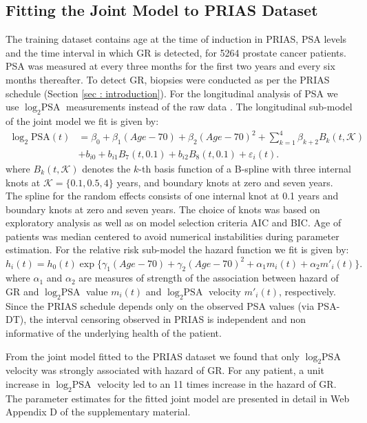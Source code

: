 \subsection{Fitting the Joint Model to PRIAS Dataset}
\label{subsec : jm_fit_prias}
The training dataset contains age at the time of induction in PRIAS, PSA levels and the time interval in which GR is detected, for 5264 prostate cancer patients. PSA was measured at every three months for the first two years and every six months thereafter. To detect GR, biopsies were conducted as per the PRIAS schedule (Section \ref{sec : introduction}). For the longitudinal analysis of PSA we use $\log_2 \mbox{PSA}$ measurements instead of the raw data \citep{nieboer2015nonlinear}. The longitudinal sub-model of the joint model we fit is given by:
\begin{equation}
\label{eq : long_model_prias}
\begin{aligned}
\log_2 \mbox{PSA}(t) &= \beta_0 + \beta_1 (Age-70) + \beta_2 (Age-70)^2 + \sum_{k=1}^4 \beta_{k+2} B_k(t,\mathcal{K})\\ 
&+  b_{i0} + b_{i1} B_7(t, 0.1) + b_{i2} B_8(t, 0.1) +
\varepsilon_i(t).
\end{aligned}
\end{equation}
where $B_k(t, \mathcal{K})$ denotes the $k$-th basis function of a B-spline with three internal knots at $\mathcal{K} =\{0.1, 0.5, 4\}$ years, and boundary knots at zero and seven years. The spline for the random effects consists of one internal knot at 0.1 years and boundary knots at zero and seven years. The choice of knots was based on exploratory analysis as well as on model selection criteria AIC and BIC. Age of patients was median centered to avoid numerical instabilities during parameter estimation. For the relative risk sub-model the hazard function we fit is given by:
\begin{equation}
\label{eq : hazard_prias}
h_i(t) = h_0(t) \exp\big\{\gamma_1 (Age-70)  + \gamma_2 (Age-70)^2 + \alpha_1 m_i(t) + \alpha_2 m'_i(t)\big\}.
\end{equation}
where $\alpha_1$ and $\alpha_2$ are measures of strength of the association between hazard of GR and $\log_2 \mbox{PSA}$ value $m_i(t)$ and $\log_2 \mbox{PSA}$ velocity $m'_i(t)$, respectively. Since the PRIAS schedule depends only on the observed PSA values (via PSA-DT), the interval censoring observed in PRIAS is independent and non informative of the underlying health of the patient.

From the joint model fitted to the PRIAS dataset we found that only $\log_2 \mbox{PSA}$ velocity was strongly associated with hazard of GR. For any patient, a unit increase in $\log_2 \mbox{PSA}$ velocity led to an 11 times increase in the hazard of GR. The parameter estimates for the fitted joint model are presented in detail in Web Appendix D of the supplementary material. 

